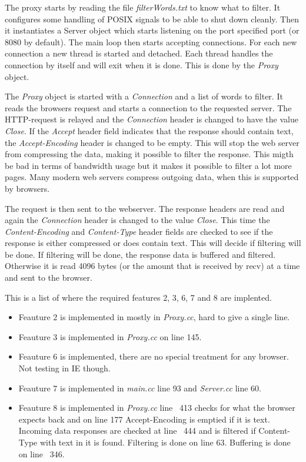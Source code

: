 \documentclass[a4paper,11pt]{article}
\begin{document}
The proxy starts by reading the file \emph{filterWords.txt} to know what to filter.
It configures some handling of POSIX signals to be able to shut down cleanly.
Then it instantiates a Server object which starts listening on the port specified port (or 8080 by default).
The main loop then starts accepting connections.
For each new connection a new thread is started and detached.
Each thread handles the connection by itself and will exit when it is done.
This is done by the \emph{Proxy} object.

The \emph{Proxy} object is started with a \emph{Connection} and a list of words to filter.
It reads the browsers request and starts a connection to the requested server.
The HTTP-request is relayed and the \emph{Connection} header is changed to have the value \emph{Close}.
If the \emph{Accept} header field indicates that the response should contain text, the \emph{Accept-Encoding} header is changed to be empty.
This will stop the web server from compressing the data, making it possible to filter the response.
This migth be bad in terms of bandwidth usage but it makes it possible to filter a lot more pages. 
Many modern web servers compress outgoing data, when this is supported by browsers.

The request is then sent to the webserver.
The response headers are read and again the \emph{Connection} header is changed to the value \emph{Close}. 
This time the \emph{Content-Encoding} and \emph{Content-Type} header fields are checked to see if the response is either compressed or does contain text.
This will decide if filtering will be done.
If filtering will be done, the response data is buffered and filtered.
Otherwise it is read 4096 bytes (or the amount that is received by recv) at a time and sent to the browser.

This is a list of where the required features 2, 3, 6, 7 and 8 are implented.
\begin{itemize}
  \item Feauture 2 is implemented in mostly in \emph{Proxy.cc}, hard to give a single line.
  \item Feauture 3 is implemented in \emph{Proxy.cc} on line 145.
  \item Feauture 6 is implemented, there are no special treatment for any browser. Not testing in IE though.
  \item Feauture 7 is implemented in \emph{main.cc} line 93 and \emph{Server.cc} line 60.
  \item Feauture 8 is implemented in \emph{Proxy.cc} line ~413 checks for what the browser expects back and on line 177 Accept-Encoding is emptied if it is text.
    Incoming data responses are checked at line ~444 and is filtered if Content-Type with text in it is found.
    Filtering is done on line 63.
    Buffering is done on line ~346.
\end{itemize}
\end{document}
